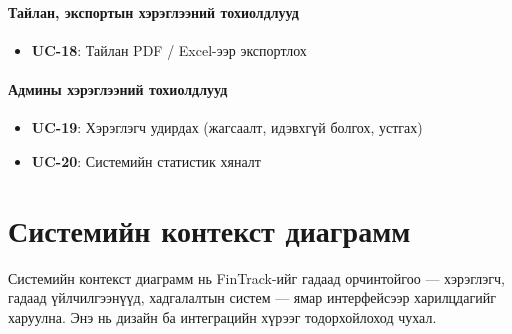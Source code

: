 \paragraph{Тайлан, экспортын хэрэглээний тохиолдлууд}
\begin{itemize}
    \item \textbf{UC-18}: Тайлан PDF / Excel-ээр экспортлох
\end{itemize}

\paragraph{Админы хэрэглээний тохиолдлууд}
\begin{itemize}
    \item \textbf{UC-19}: Хэрэглэгч удирдах (жагсаалт, идэвхгүй болгох, устгах)
    \item \textbf{UC-20}: Системийн статистик хяналт
\end{itemize}

\section{Системийн контекст диаграмм}
Системийн контекст диаграмм нь FinTrack-ийг гадаад орчинтойгоо --- хэрэглэгч, гадаад үйлчилгээнүүд, хадгалалтын систем --- ямар интерфейсээр харилцдагийг харуулна. Энэ нь дизайн ба интеграцийн хүрээг тодорхойлоход чухал.

